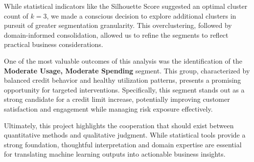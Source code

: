 \documentclass{article}
\begin{document}
While statistical indicators like the Silhouette Score suggested an optimal cluster count of $k=3$, we made a conscious decision to explore additional clusters in pursuit of greater segmentation granularity. This overclustering, followed by domain-informed consolidation, allowed us to refine the segments to reflect practical business considerations.

One of the most valuable outcomes of this analysis was the identification of the \textbf{Moderate Usage, Moderate Spending} segment. This group, characterized by balanced credit behavior and healthy utilization patterns, presents a promising opportunity for targeted interventions. Specifically, this segment stands out as a strong candidate for a credit limit increase, potentially improving customer satisfaction and engagement while managing risk exposure effectively.

Ultimately, this project highlights the cooperation that should exist between quantitative methods and qualitative judgment. While statistical tools provide a strong foundation, thoughtful interpretation and domain expertise are essential for translating machine learning outputs into actionable business insights.
\end{document}
